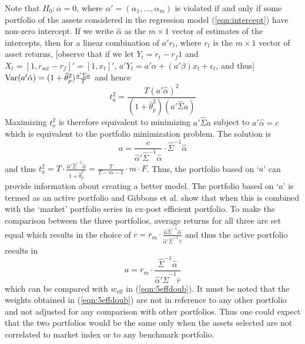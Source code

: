	
Note that $H_0: \alpha=0$, where $\alpha'=(\alpha_1,\ldots,\alpha_m)$ is violated if and only if some portfolio of the assets considered in the regression model (\ref{eqn:intercept}) have non-zero intercept. If we write $\hat{\alpha}$ as the $m\times 1$ vector of estimates of the intercepts, then for a linear combination of $a'r_t$, where $r_t$ is the $m \times 1$ vector of asset returns, [observe that if we let $Y_t=r_t-r_f1$ and $X_t=[1,r_{mt}-r_f]'=[1,x_t]'$, $a'Y_t=a' \alpha + (a'\beta) x_t + \epsilon_t$, and thus] $\operatorname{Var}(a'\hat{\alpha})= (1+\hat{\theta}_p^2) \frac{a' \hat{\Sigma}a}{T}$ and hence
	\begin{equation}\label{eqn:smallt}
	t_a^2= \dfrac{T(a'\hat{\alpha})^2}{(1+\hat{\theta}_p^2)(a' \hat{\Sigma} a)}
	\end{equation}
Maximizing $t_a^2$ is therefore equivalent to minimizing $a' \hat{\Sigma}a$ subject to $a'\hat{\alpha}= c$ which is equivalent to the portfolio minimization problem. The solution is
	\begin{equation}\label{eqn:5a}
	a= \dfrac{c}{\hat{\alpha}' \hat{\Sigma}^{-1} \hat{\alpha}} \cdot \hat{\Sigma}^{-1} \hat{\alpha}
	\end{equation}
and thus $t_a^2= T \cdot \frac{\hat{\alpha}' \hat{\Sigma}^{-1} \hat{\alpha}}{1+\hat{\theta}_p^2}= \frac{T}{T-m-1} \cdot m \cdot F$. Thus, the portfolio based on `$a$' can provide information about creating a better model. The portfolio based on `$a$' is termed as an active portfolio and Gibbons et al. show that when this is combined with the `market' portfolio series in ex-post efficient portfolio. To make the comparison between the three portfolios, average returns for all three are set equal which results in the choice of $c=\overline{r}_m \cdot \frac{\hat{\alpha} \hat{\Sigma}^{-1} \hat{\alpha}}{\hat{\alpha}' \hat{\Sigma}^{-1} \hat{\gamma}}$ and thus the active portfolio results in 
	\begin{equation}\label{eqn:5a2}
	a= \overline{r}_m \cdot \dfrac{\hat{\Sigma}^{-1} \hat{\alpha}}{\hat{\alpha}' \hat{\Sigma}^{-1} \overline{r}}
	\end{equation}	
which can be compared with $w_{\text{eff}}$ in (\ref{eqn:5effdoub}). It must be noted that the weights obtained in (\ref{eqn:5effdoub}) are not in reference to any other portfolio and not adjusted for any comparison with other portfolios. Thus one could expect that the two portfolios would be the same only when the assets selected are not correlated to market index or to any benchmark portfolio. 


